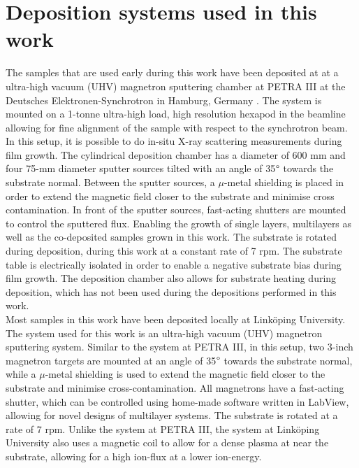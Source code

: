 \section{Deposition systems used in this work}\label{petraIII}
The samples that are used early during this work have been deposited at at a ultra-high vacuum (UHV) magnetron sputtering chamber at PETRA III at the Deutsches Elektronen-Synchrotron in Hamburg, Germany \cite{petraiii}.  The system is mounted on a 1-tonne ultra-high load, high resolution hexapod in the beamline allowing for fine alignment of the sample with respect to the synchrotron beam. In this setup, it is possible to do in-situ X-ray scattering measurements during film growth. The cylindrical deposition chamber has a diameter of 600 mm and four 75-mm diameter sputter sources tilted with an angle of 35$\degree$ towards the substrate normal. Between the sputter sources, a $\mu$-metal shielding is placed in order to extend the magnetic field closer to the substrate and minimise cross contamination. In front of the sputter sources, fast-acting shutters are mounted to control the sputtered flux. Enabling the growth of single layers, multilayers as well as the co-deposited samples grown in this work. The substrate is rotated during deposition, during this work at a constant rate of 7 rpm. The substrate table is electrically isolated in order to enable a negative substrate bias during film growth. The deposition chamber also allows for substrate heating during deposition, which has not been used during the depositions performed in this work. \\
Most samples in this work have been deposited locally at Linköping University. The system used for this work is an ultra-high vacuum (UHV) magnetron sputtering system. Similar to the system at PETRA III, in this setup, two 3-inch magnetron targets are mounted at an angle of 35$\degree$ towards the substrate normal, while a $\mu$-metal shielding is used to extend the magnetic field closer to the substrate and minimise cross-contamination. All magnetrons have a fast-acting shutter, which can be controlled using home-made software written in LabView, allowing for novel designs of multilayer systems. The substrate is rotated at a rate of 7 rpm. Unlike the system at PETRA III, the system at Linköping University also uses a magnetic coil to allow for a dense plasma at near the substrate, allowing for a high ion-flux at a lower ion-energy. 